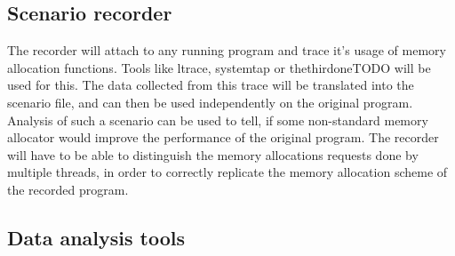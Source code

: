 \subsection{Scenario recorder}

The recorder will attach to any running program and trace it's usage of memory allocation functions. Tools like ltrace\cite{ltrace}, systemtap\cite{systemtap} or thethirdoneTODO\cite{TODO!} will be used for this. The data collected from this trace will be translated into the scenario file, and can then be used independently on the original program. Analysis of such a scenario can be used to tell, if some non-standard memory allocator would improve the performance of the original program. The recorder will have to be able to distinguish the memory allocations requests done by multiple threads, in order to correctly replicate the memory allocation scheme of the recorded program.

\subsection{Data analysis tools}

